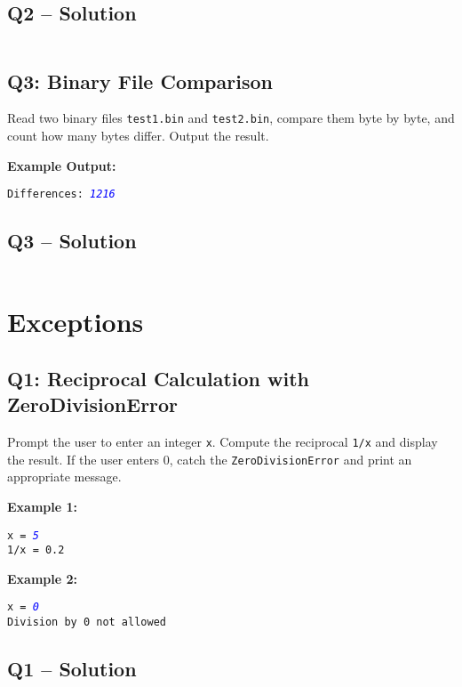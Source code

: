 \documentclass[a4paper,11pt]{article}
\begin{document}
\subsection*{Q2 – Solution}
\inputminted{python}{Files/12/2.py}


\subsection*{Q3: Binary File Comparison}
Read two binary files \texttt{test1.bin} and \texttt{test2.bin}, compare them byte by byte, and count how many bytes differ. Output the result.

\textbf{Example Output:}
\begin{flushleft}
	\texttt{Differences: \textcolor{blue}{\textit{1216}}}
\end{flushleft}


\subsection*{Q3 – Solution}
\inputminted{python}{Files/12/3.py}

\newpage
\section{Exceptions}

\subsection*{Q1: Reciprocal Calculation with ZeroDivisionError}
Prompt the user to enter an integer \texttt{x}. Compute the reciprocal \texttt{1/x} and display the result. If the user enters 0, catch the \texttt{ZeroDivisionError} and print an appropriate message.

\textbf{Example 1:}
\begin{flushleft}
	\texttt{x = \textcolor{blue}{\textit{5}}}\\
	\texttt{1/x = 0.2}
\end{flushleft}

\textbf{Example 2:}
\begin{flushleft}
	\texttt{x = \textcolor{blue}{\textit{0}}}\\
	\texttt{Division by 0 not allowed}
\end{flushleft}

\subsection*{Q1 – Solution}
\inputminted{python}{Files/13/1.py}
\end{document}

